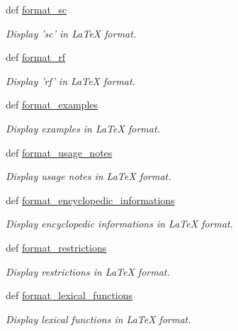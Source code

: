 \begin{DoxyCompactItemize}
def \hyperlink{namespacelmf_1_1src_1_1config_1_1tex_a513b89ff96fd7e2855aa899ac03491fa}{format\+\_\+sc}
\begin{DoxyCompactList}\small\item\em Display 'sc' in La\+Te\+X format. \end{DoxyCompactList}\item 
def \hyperlink{namespacelmf_1_1src_1_1config_1_1tex_a66df73ec575786d5cd3e0abb40793c1c}{format\+\_\+rf}
\begin{DoxyCompactList}\small\item\em Display 'rf' in La\+Te\+X format. \end{DoxyCompactList}\item 
def \hyperlink{namespacelmf_1_1src_1_1config_1_1tex_a760a9e5b857d90ecc262db56a82f9c22}{format\+\_\+examples}
\begin{DoxyCompactList}\small\item\em Display examples in La\+Te\+X format. \end{DoxyCompactList}\item 
def \hyperlink{namespacelmf_1_1src_1_1config_1_1tex_ad8cf14c27e547612b29e9e6a7a070e30}{format\+\_\+usage\+\_\+notes}
\begin{DoxyCompactList}\small\item\em Display usage notes in La\+Te\+X format. \end{DoxyCompactList}\item 
def \hyperlink{namespacelmf_1_1src_1_1config_1_1tex_a17fa95160aec98e3ef33840fe9873035}{format\+\_\+encyclopedic\+\_\+informations}
\begin{DoxyCompactList}\small\item\em Display encyclopedic informations in La\+Te\+X format. \end{DoxyCompactList}\item 
def \hyperlink{namespacelmf_1_1src_1_1config_1_1tex_a29e656c70350457c30eb469791a535c8}{format\+\_\+restrictions}
\begin{DoxyCompactList}\small\item\em Display restrictions in La\+Te\+X format. \end{DoxyCompactList}\item 
def \hyperlink{namespacelmf_1_1src_1_1config_1_1tex_af81055cb765190891611747edc3d4ead}{format\+\_\+lexical\+\_\+functions}
\begin{DoxyCompactList}\small\item\em Display lexical functions in La\+Te\+X format. \end{DoxyCompactList}\item 

\end{DoxyCompactItemize}
